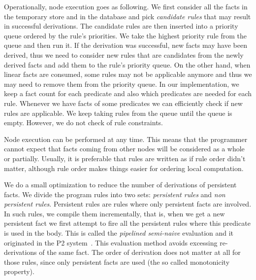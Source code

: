 Operationally, node execution goes as following. We first consider all the facts in the
temporary store and in the database and pick \emph{candidate rules} that may result in
successful derivations. The candidate rules are then inserted into a priority queue ordered
by the rule's priorities. We take the highest priority rule from the queue and then run it.
If the derivation was successful, new facts may have been derived, thus we need to consider new
rules that are candidates from the newly derived facts and add them to the rule's priority queue.
On the other hand, when linear facts are consumed, some rules may not be applicable anymore and thus
we may need to remove them from the priority queue. In our implementation,
we keep a fact count for each predicate and also which predicates are needed for each rule. Whenever we have facts of some
predicates we can efficiently check if new rules are applicable. We keep taking rules from the
queue until the queue is empty. However, we do not check of rule constraints.

Node execution can be performed at any time. This means that the programmer cannot expect
that facts coming from other nodes will be considered as a whole or partially.
Usually, it is preferable that rules are written as if rule order didn't matter, although
rule order makes things easier for ordering local computation.

We do a small optimization to reduce the number of derivations of persistent facts. We
divide the program rules into two sets: \emph{persistent rules} and \emph{non persistent rules}.
Persistent rules are rules where only persistent facts are involved. In such rules, we compile
them incrementally, that is, when we get a new persistent fact we first attempt to fire
all the persistent rules where this predicate is used in the body. This is called
the \emph{pipelined semi-naive} evaluation and it originated in the P2 system~\cite{Loo-condie-garofalakis-p2}. This evaluation method avoids excessing re-derivations
of the same fact. The order of derivation does not matter at all for those rules, since
only persistent facts are used (the so called monotonicity property).